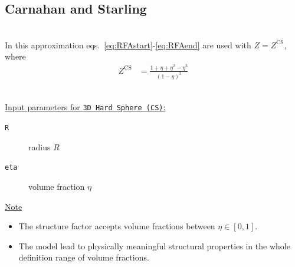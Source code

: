 \vspace{5mm}

\subsection{Carnahan and Starling} \cite{Carnahan1969} ~\\

\noindent In this approximation eqs.\ \ref{eq:RFAstart}-\ref{eq:RFAend} are used with $Z=Z^\mathrm{CS}$, where
\begin{align}
Z^\mathrm{CS} &= \frac{1+\eta+\eta^2-\eta^3}{\left(1-\eta\right)^3}
\end{align}

\vspace{5mm}

\hspace{1pt}\\
\uline{Input parameters for \texttt{3D Hard Sphere (CS)}:}
\begin{description}
    \item[\texttt{R}]  radius $R$
    \item[\texttt{eta}] volume fraction $\eta$
\end{description}

\noindent
\uline{Note}
\begin{itemize}
\item The structure factor accepts volume fractions between $\eta \in [0,1]$.
\item The model lead to physically meaningful structural properties in the whole definition range of volume fractions.
\end{itemize}

